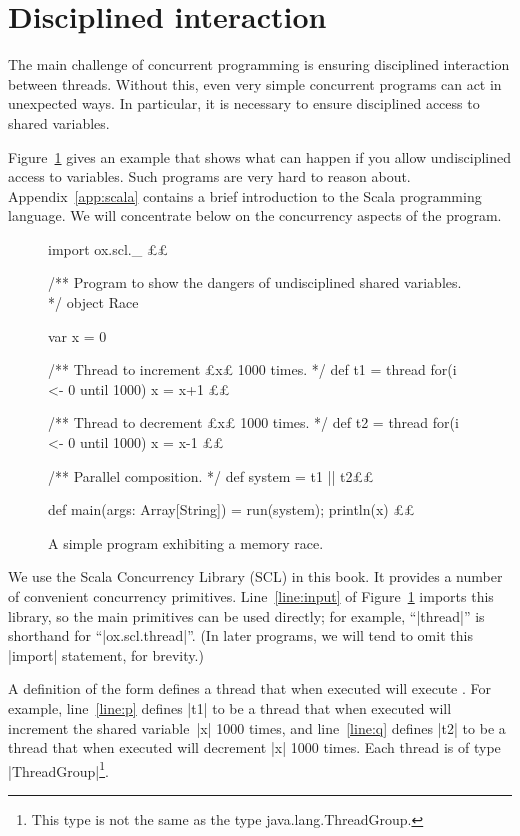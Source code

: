 
\section{Disciplined interaction}

The main challenge of concurrent programming is ensuring disciplined
interaction between threads.  Without this, even very simple concurrent
programs can act in unexpected ways.  In particular, it is necessary to ensure
disciplined access to shared variables.

Figure~\ref{fig:race} gives an example that shows what can happen if you allow
undisciplined access to variables.  Such programs are very hard to reason
about.
Appendix~\ref{app:scala} contains a brief introduction to the Scala
programming language.  We will concentrate below on the concurrency aspects of
the program. 


\begin{figure}
\begin{scala}[numbers = left]
import ox.scl._  £\label{line:input}£

/** Program to show the dangers of undisciplined shared variables. */
object Race{
  var x = 0

  /** Thread to increment £x£ 1000 times. */
  def t1 = thread{ for(i <- 0 until 1000) x = x+1 }£\label{line:p}£

  /** Thread to decrement £x£ 1000 times. */
  def t2 = thread{ for(i <- 0 until 1000) x = x-1 }£\label{line:q}£

  /** Parallel composition. */
  def system = t1 || t2£\label{line:system}£

  def main(args: Array[String]) = { run(system); println(x) }£\label{line:main}£
}
\end{scala}%
\caption{A simple program exhibiting a memory race.}
\label{fig:race}
\end{figure}


We use the Scala Concurrency Library (SCL) in this book.  It provides a number
of convenient concurrency primitives.  Line~\ref{line:input} of
Figure~\ref{fig:race} imports this library, so the main primitives can be used
directly; for example, ``|thread|'' is shorthand for ``|ox.scl.thread|''.  (In
later programs, we will tend to omit this |import| statement, for brevity.)

A definition of the form  defines a thread that when
executed will execute .  For example, line~\ref{line:p} defines
|t1| to be a thread that when executed will increment the shared variable~|x|
1000 times, and line~\ref{line:q} defines |t2| to be a thread that when
executed will decrement |x| 1000 times.  Each thread is of type
|ThreadGroup|\footnote{This type is not the same as the type {\scalashape
    java.lang.ThreadGroup}.}.

